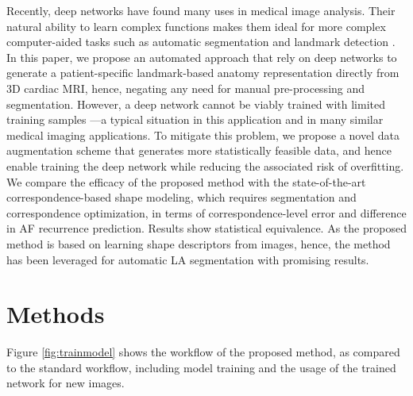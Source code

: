 \documentclass[twocolumn]{cinc}
\begin{document}
Recently, deep networks have found many uses in medical image analysis. Their natural ability to learn complex functions makes them ideal for more complex computer-aided tasks such as automatic segmentation \cite{ronneberger2015unet} and landmark detection \cite{zheng2015detection}. In this paper, we propose an automated approach that rely on deep networks to generate a patient-specific landmark-based anatomy representation directly from 3D cardiac MRI, hence, negating any need for manual pre-processing and segmentation. 
%
However, a deep network cannot be viably trained with limited training samples ---a typical situation in this application and in many similar medical imaging applications.
%
To mitigate this problem, we propose a novel data augmentation scheme that generates more statistically feasible data, and hence enable training the deep network while reducing the associated risk of overfitting.
%
We compare the efficacy of the proposed method with the state-of-the-art correspondence-based shape modeling, which requires segmentation and correspondence optimization, in terms of correspondence-level error and difference in AF recurrence prediction. Results show statistical equivalence. As the proposed method is based on learning shape descriptors from images, hence, the method has been leveraged for automatic LA segmentation with  promising results.
\vspace{-0.1in}
\section{Methods}
 \vspace{-0.1in}
Figure \ref{fig:trainmodel} shows the workflow of the proposed method, as compared to the standard workflow, including model training and the usage of the trained network for new images.
\end{document}
